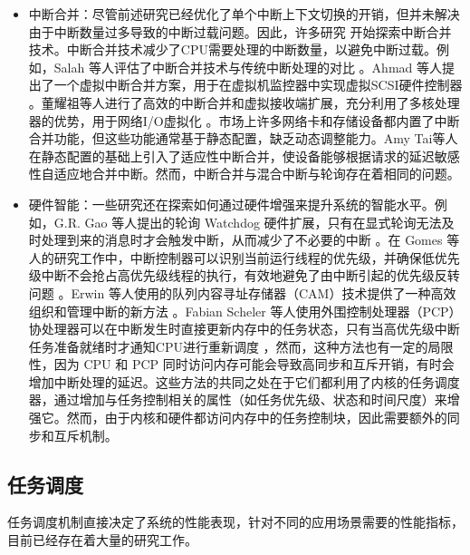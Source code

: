 \begin{itemize}
    \item 中断合并：尽管前述研究已经优化了单个中断上下文切换的开销，但并未解决由于中断数量过多导致的中断过载问题。因此，许多研究 \cite{salah_coalesce_2007, ahmad2009improving, Ahmad2011vICIC, Dong2011, GuanEICS2013, AmyTai2021} 开始探索中断合并技术。中断合并技术减少了CPU需要处理的中断数量，以避免中断过载。例如，Salah 等人评估了中断合并技术与传统中断处理的对比 \cite{salah_coalesce_2007}。Ahmad 等人提出了一个虚拟中断合并方案，用于在虚拟机监控器中实现虚拟SCSI硬件控制器 \cite{ahmad2009improving, Ahmad2011vICIC}。董耀祖等人进行了高效的中断合并和虚拟接收端扩展，充分利用了多核处理器的优势，用于网络I/O虚拟化 \cite{Dong2011, GuanEICS2013}。市场上许多网络卡和存储设备都内置了中断合并功能，但这些功能通常基于静态配置，缺乏动态调整能力。Amy Tai等人\cite{AmyTai2021}在静态配置的基础上引入了适应性中断合并，使设备能够根据请求的延迟敏感性自适应地合并中断。然而，中断合并与混合中断与轮询存在着相同的问题。
    
    \item 硬件智能：一些研究还在探索如何通过硬件增强来提升系统的智能水平。例如，G.R. Gao 等人提出的轮询 Watchdog 硬件扩展，只有在显式轮询无法及时处理到来的消息时才会触发中断，从而减少了不必要的中断 \cite{Gao1996}。在 Gomes 等人的研究工作中，中断控制器可以识别当前运行线程的优先级，并确保低优先级中断不会抢占高优先级线程的执行，有效地避免了由中断引起的优先级反转问题 \cite{Gomes2015}。Erwin 等人使用的队列内容寻址存储器（CAM）技术提供了一种高效组织和管理中断的新方法 \cite{Erwin1970}。Fabian Scheler 等人使用外围控制处理器（PCP）协处理器可以在中断发生时直接更新内存中的任务状态，只有当高优先级中断任务准备就绪时才通知CPU进行重新调度 \cite{SchelerHOPSL09}，然而，这种方法也有一定的局限性，因为 CPU 和 PCP 同时访问内存可能会导致高同步和互斥开销，有时会增加中断处理的延迟。这些方法的共同之处在于它们都利用了内核的任务调度器，通过增加与任务控制相关的属性（如任务优先级、状态和时间尺度）来增强它。然而，由于内核和硬件都访问内存中的任务控制块，因此需要额外的同步和互斥机制。
\end{itemize}

\subsection{任务调度}

任务调度机制直接决定了系统的性能表现，针对不同的应用场景需要的性能指标，目前已经存在着大量的研究工作。

